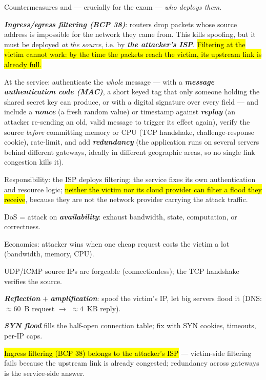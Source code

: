 \documentclass[12pt, a4paper]{article}
\newcommand{\term}[1]{\textbf{\textit{#1}}}        %
\newcommand{\imp}[1]{\hl{#1}}                       %
\begin{document}
Countermeasures and --- crucially for the exam --- \emph{who deploys them}.
\begin{tightitem}
    \item \term{Ingress/egress filtering (BCP 38)}: routers drop packets whose source address is impossible for the network they came from.
    This kills spoofing, but it must be deployed \emph{at the source}, i.e. by \term{the attacker's ISP}. \imp{Filtering at the victim cannot work: by the time the packets reach the victim, its upstream link is already full.}
    \item At the service: authenticate the \emph{whole} message --- with a \term{message authentication code (MAC)}, a short keyed tag that only someone holding the shared secret key can produce, or with a digital signature over every field --- and include a \term{nonce} (a fresh random value) or timestamp against \term{replay} (an attacker re-sending an old, valid message to trigger its effect again), verify the source \emph{before} committing memory or CPU (TCP handshake, challenge-response cookie), rate-limit, and add \term{redundancy} (the application runs on several servers behind different gateways, ideally in different geographic areas, so no single link congestion kills it).
    \item Responsibility: the ISP deploys filtering; the service fixes its own authentication and resource logic; \imp{neither the victim nor its cloud provider can filter a flood they receive}, because they are not the network provider carrying the attack traffic.
\end{tightitem}

\begin{theorybox}
\begin{tightitem}
    \item DoS = attack on \term{availability}: exhaust bandwidth, state, computation, or correctness.
    \item Economics: attacker wins when one cheap request costs the victim a lot (bandwidth, memory, CPU).
    \item UDP/ICMP source IPs are forgeable (connectionless); the TCP handshake verifies the source.
    \item \term{Reflection} $+$ \term{amplification}: spoof the victim's IP, let big servers flood it (DNS: $\approx 60$~B request $\rightarrow$ $\approx 4$~KB reply).
    \item \term{SYN flood} fills the half-open connection table; fix with SYN cookies, timeouts, per-IP caps.
    \item \imp{Ingress filtering (BCP 38) belongs to the attacker's ISP} --- victim-side filtering fails because the upstream link is already congested; redundancy across gateways is the service-side answer.
\end{tightitem}
\end{theorybox}
\end{document}
